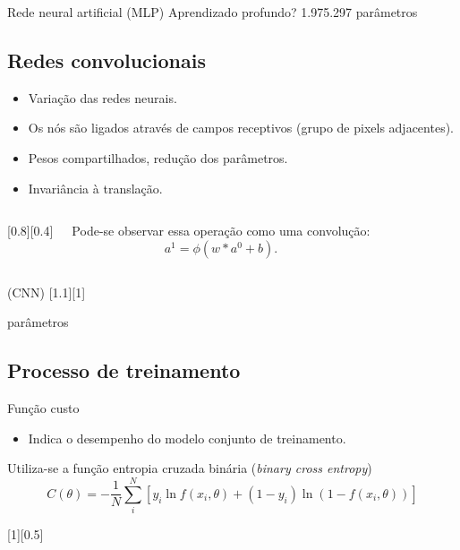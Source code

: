 \begin{frame}{Rede neural artificial (MLP)}
	\pause
	\vspace{-30pt}
	\center Aprendizado profundo?
	1.975.297 parâmetros
\end{frame}

\subsection{Redes convolucionais}
\begin{frame}{\insertsubsection}
	\begin{itemize}
	\item Variação das redes neurais.
	\item Os nós são ligados através de campos receptivos (grupo de pixels adjacentes).
	\item Pesos compartilhados, redução dos parâmetros.
	\item Invariância à translação.
	\end{itemize}

	\begin{columns}
		[0.8][0.4]

		Pode-se observar essa operação como uma convolução:
		\begin{equation*}
		a^1 = \phi(w \ast a^0 + b).
		\end{equation*}

	\end{columns}

\end{frame}

\begin{frame}{\insertsubsection (CNN)}
	[1.1][1]

	\vspace{-30pt}
	 parâmetros
\end{frame}

\subsection{Processo de treinamento}

\begin{frame}{Função custo}
	\begin{itemize}
	\item Indica o desempenho do modelo conjunto de treinamento.
	\end{itemize}

	\pause

	Utiliza-se a função entropia cruzada binária (\textit{binary cross entropy})
	\begin{equation*}
	C(\theta) = -\frac{1}{N} \sum_i^N \left[y_i \ln f(x_i,\theta) + (1-y_i) \ln (1-f(x_i,\theta))\right]
	\end{equation*}

	[0.5]
\end{frame}

